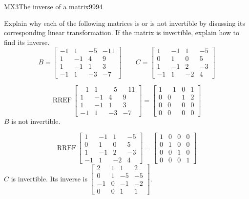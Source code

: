 \begin{exercise}{MX3}{The inverse of a matrix}{9994} 
\begin{exerciseStatement} 

 Explain why each of the following matrices is or is not invertible by disussing its corresponding linear transformation. If the matrix is invertible, explain how to find its inverse. \[
\hspace{2em}
B = \left[\begin{array}{cccc}
-1 & 1 & -5 & -11 \\
1 & -1 & 4 & 9 \\
1 & -1 & 1 & 3 \\
-1 & 1 & -3 & -7
\end{array}\right]
\hspace{2em}
C = \left[\begin{array}{cccc}
1 & -1 & 1 & -5 \\
0 & 1 & 0 & 5 \\
1 & -1 & 2 & -3 \\
-1 & 1 & -2 & 4
\end{array}\right]
\hspace{2em}
        \] 

 \end{exerciseStatement}
 \begin{exerciseAnswer} 

 \[\mathrm{RREF}\,\left[\begin{array}{cccc}
-1 & 1 & -5 & -11 \\
1 & -1 & 4 & 9 \\
1 & -1 & 1 & 3 \\
-1 & 1 & -3 & -7
\end{array}\right]=\left[\begin{array}{cccc}
1 & -1 & 0 & 1 \\
0 & 0 & 1 & 2 \\
0 & 0 & 0 & 0 \\
0 & 0 & 0 & 0
\end{array}\right]\] \(B\) is not invertible. 

 

 \[\mathrm{RREF}\,\left[\begin{array}{cccc}
1 & -1 & 1 & -5 \\
0 & 1 & 0 & 5 \\
1 & -1 & 2 & -3 \\
-1 & 1 & -2 & 4
\end{array}\right]=\left[\begin{array}{cccc}
1 & 0 & 0 & 0 \\
0 & 1 & 0 & 0 \\
0 & 0 & 1 & 0 \\
0 & 0 & 0 & 1
\end{array}\right]\] \(C\) is invertible. Its inverse is \(\left[\begin{array}{cccc}
2 & 1 & 1 & 2 \\
0 & 1 & -5 & -5 \\
-1 & 0 & -1 & -2 \\
0 & 0 & 1 & 1
\end{array}\right]\). 

 \end{exerciseAnswer}
 \end{exercise}



